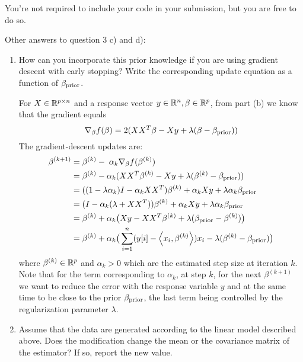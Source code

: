 \documentclass[12pt,twoside]{article}
\begin{document}
\begin{enumerate}
\begin{enumerate}
  \end{enumerate}
You're not required to include your code in your submission, but you are free to do so. 
 \end{enumerate}
 
 Other answers to question 3 c) and d):
 \begin{enumerate}
 
     \item How can you incorporate this prior knowledge if you are using gradient descent with early stopping? Write the corresponding update equation as a function of $\beta_{\operatorname{prior}}$.\\

\medskip				

For $X  \in \mathbb{R}^{p \times n}$ and a response vector $y \in \mathbb{R}^n, \beta \in \mathbb{R}^p$, from part (b) we know that the gradient equals $$\nabla_{\beta} f(\beta) =	2 (X X^T \beta - X y +  \lambda (\beta - \beta_{\operatorname{prior}}))$$
The gradient-descent updates are:
\begin{align*}
		\beta^{(k+1)}	&=	\beta^{(k)} - \; \alpha_k \nabla_{\beta} f(\beta^{(k)})	\\
					&=	\beta^{(k)}  - \alpha_k (X X^T \beta^{(k)} - X y +  \lambda (\beta^{(k)} - \beta_{\operatorname{prior}})) \\
					&=    ((1- \lambda \alpha_k) I  - \alpha_k X X^T) \beta^{(k)}  +  \alpha_k  X y  + \lambda  \alpha_k  \beta_{\operatorname{prior}} \\
					&=	(I -  \alpha_k (\lambda +  X X^T)) \beta^{(k)}  +  \alpha_k  X y  + \lambda  \alpha_k  \beta_{\operatorname{prior}} \\
					&=	\beta^{(k)}  + \alpha_k  \big( X y  - X X^T \beta^{(k)}   + \lambda (\beta_{\operatorname{prior}} - \beta^{(k)}) \big) \\
					&=	 \beta^{(k)}  +  \alpha_k  \big( \sum_{i=1}^n (y[i] - \left \langle x_i, \beta^{(k)}\right \rangle) x_i - \lambda ( \beta^{(k)}  -   \beta_{\operatorname{prior}}) \big)
\end{align*}
   where $\beta^{(k)} \in \mathbb{R}^p$ and $ \alpha_k > 0$ which are the estimated step size at iteration $k$. Note that for the term corresponding to $\alpha_k$, at  step $k$, for the next $\beta^{(k+1)}$ 
   we want to reduce the error with the response variable $y$  and at the same time to be close to the prior $\beta_{\operatorname{prior}}$, the last term being controlled by the regularization parameter $\lambda$.
   
    \item Assume that the data are generated according to the linear model described above. Does the modification change the mean or the covariance matrix of the estimator? If so, report the new value.\\
    

\end{enumerate}
\end{document}
